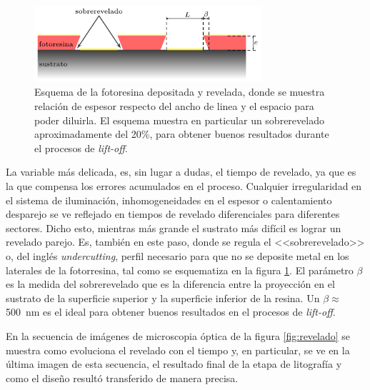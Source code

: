 {					%
 				\begin{figure}[ht!]
 				\centering
 				\includegraphics[width=0.75\textwidth]{Esquemas/altura-ancho.pdf}
 				\caption[Perfil de fotorresina para el decapado o\textit{ lift-off}]{Esquema de la fotoresina depositada y revelada, donde se muestra relación de espesor respecto del ancho de linea y el espacio para poder diluirla. El esquema muestra en particular un sobrerevelado aproximadamente del 20\%, para obtener buenos resultados durante el procesos de\textit{ lift-off}.}
 				\label{fig:undercut}
 				\end{figure}

 	   		 La variable más delicada, es, sin lugar a dudas, el tiempo de revelado, ya que es la que compensa los errores acumulados en el proceso. Cualquier irregularidad en el sistema de iluminación, inhomogeneidades en el espesor o calentamiento desparejo se ve reflejado en tiempos de revelado diferenciales para diferentes sectores. Dicho esto, mientras más grande el sustrato más difícil es lograr un revelado parejo. Es, también en este paso, donde se regula el <<sobrerevelado>> o, del inglés \textit{undercutting}, perfil necesario para que no se deposite metal en los laterales de la fotorresina, tal como se esquematiza en la figura \ref{fig:undercut}. El parámetro $\beta$ es la medida del sobrerevelado que es la diferencia entre la proyección en el sustrato de la superficie superior y la superficie inferior de la resina. Un $\beta \approx$\SI{500}{\nm} es el ideal para obtener buenos resultados en el procesos de \textit{lift-off}. 
 
 	         En la secuencia de imágenes de microscopia óptica de la figura \ref{fig:revelado} se muestra como evoluciona el revelado con el tiempo y, en particular, se ve en la última imagen de esta secuencia, el resultado final de la etapa de litografía y como el diseño resultó transferido de manera precisa.

}
